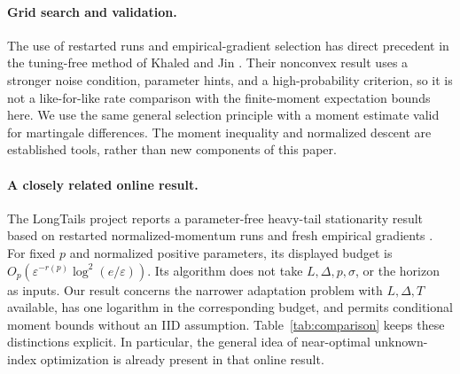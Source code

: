 \documentclass[11pt,a4paper]{article}
\newcommand{\eps}{\varepsilon}
\theoremstyle{definition}
\theoremstyle{remark}
\begin{document}
\paragraph{Grid search and validation.}
The use of restarted runs and empirical-gradient selection has direct
precedent in the tuning-free method of Khaled and Jin
\cite{khaled2024tuning}. Their nonconvex result uses a stronger noise
condition, parameter hints, and a high-probability criterion, so it is not
a like-for-like rate comparison with the finite-moment expectation bounds
here. We use the same general selection principle with a moment estimate
valid for martingale differences. The moment inequality and normalized
descent are established tools, rather than new components of this paper.

\paragraph{A closely related online result.}
The LongTails project reports a parameter-free heavy-tail stationarity
result based on restarted normalized-momentum runs and fresh empirical
gradients \cite{longtails2026stationarity}. For fixed $p$ and normalized
positive parameters, its displayed budget is
$O_p(\eps^{-r(p)}\log^2(e/\eps))$.
Its algorithm does not take $L,\Delta,p,\sigma$, or the horizon as inputs.
Our result concerns the narrower adaptation problem with $L,\Delta,T$
available, has one logarithm in the corresponding budget, and permits
conditional moment bounds without an IID assumption.
Table~\ref{tab:comparison} keeps these distinctions explicit. In particular,
the general idea of near-optimal unknown-index optimization is already
present in that online result.
\end{document}
